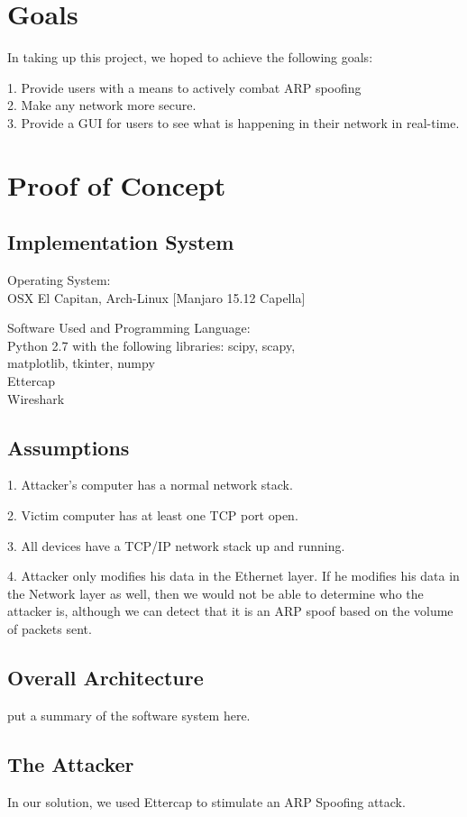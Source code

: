 \documentclass{acm_proc_article-sp}
\begin{document}
\section{Goals}
In taking up this project, we hoped to achieve the following goals: 

1. Provide users with a means to actively combat ARP spoofing \\
2. Make any network more secure. \\
3. Provide a GUI for users to see what is happening in their network in real-time. 

\section{Proof of Concept}
\subsection{Implementation System}
Operating System: \\
OSX El Capitan, Arch-Linux [Manjaro 15.12 Capella]

Software Used and Programming Language: \\
Python 2.7 with the following libraries: scipy, scapy, \\matplotlib, tkinter, numpy \\ Ettercap \\ Wireshark

\subsection{Assumptions}
1. Attacker's computer has a normal network stack. 

2. Victim computer has at least one TCP port open.

3. All devices have a TCP/IP network stack up and running.

4. Attacker only modifies his data in the Ethernet layer. If he modifies his data in the Network layer as well, then we would not be able to determine who the attacker is, although we can detect that it is an ARP spoof based on the volume of packets sent. 

\subsection{Overall Architecture}
put a summary of the software system here.

\subsection{The Attacker}
In our solution, we used Ettercap to stimulate an ARP Spoofing attack. 
\end{document}
